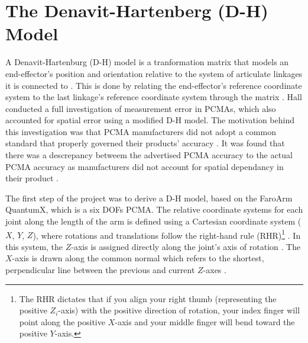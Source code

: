 \section{The Denavit-Hartenberg (D-H) Model}
A Denavit-Hartenburg (D-H) model is a tranformation matrix that models an end-effector's position and orientation relative to the system of articulate linkages it is connected to \citep{Hall:2010}. This is done by relating the end-effector's reference coordinate system to the last linkage's reference coordinate system through the matrix \citep{Hall:2010}. Hall \citep{Hall:2010} conducted a full investigation of measurement error in PCMAs, which also accounted for spatial error using a modified D-H model. The motivation behind this investigation was that PCMA manufacturers did not adopt a common standard that properly governed their products' accuracy \citep{Hall:2010}. It was found that there was a descrepancy betweem the advertised PCMA accuracy to the actual PCMA accuracy as manufacturers did not account for spatial dependancy in their product \citep{Hall:2010}.

The first step of the project was to derive a D-H model, based on the FaroArm QuantumX, which is a six DOFs PCMA. The relative coordinate systems for each joint along the length of the arm is defined using a Cartesian coordinate system ($X$, $Y$, $Z$), where rotations and translations follow the right-hand rule (RHR)\footnote{The RHR dictates that if you align your right thumb (representing the positive $Z_i$-axis) with the positive direction of rotation, your index finger will point along the positive $X$-axis and your middle finger will bend toward the positive $Y$-axis.} \citep{Hall:2010}. In this system, the $Z$-axis is assigned directly along the joint's axis of rotation \citep{Hall:2010}. The $X$-axis is drawn along the common normal which refers to the shortest, perpendicular line between the previous and current $Z$-axes \citep{Hall:2010}.

